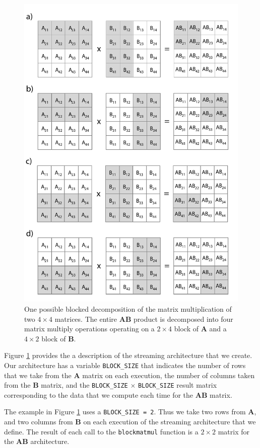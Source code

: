 \begin{figure}
\centering
\includegraphics[width=  .85\textwidth]{images/blockmm}
\caption{ One possible blocked decomposition of the matrix multiplication of two $4 \times 4$ matrices. The entire $\mathbf{AB}$ product is decomposed into four matrix multiply operations operating on a $2 \times 4$ block of $\mathbf{A}$ and a $4 \times 2$ block of $\mathbf{B}$.}
\label{fig:blockmm}
\end{figure}

Figure \ref{fig:blockmm} provides the a description of the streaming architecture that we create. Our architecture has a variable \lstinline{BLOCK_SIZE} that indicates the number of rows that we take from the $\mathbf{A}$ matrix on each execution, the number of columns taken from the $\mathbf{B}$ matrix, and the \lstinline{BLOCK_SIZE} $\times$ \lstinline{BLOCK_SIZE} result matrix corresponding to the data that we compute each time for the $\mathbf{AB}$ matrix. 

The example in Figure \ref{fig:blockmm} uses a \lstinline{BLOCK_SIZE = 2}. Thus we take two rows from $\mathbf{A}$, and two columns from $\mathbf{B}$  on each execution of the streaming architecture that we define. The result of each call to the \lstinline{blockmatmul} function is a $2 \times 2$ matrix for the $\mathbf{AB}$ architecture.

